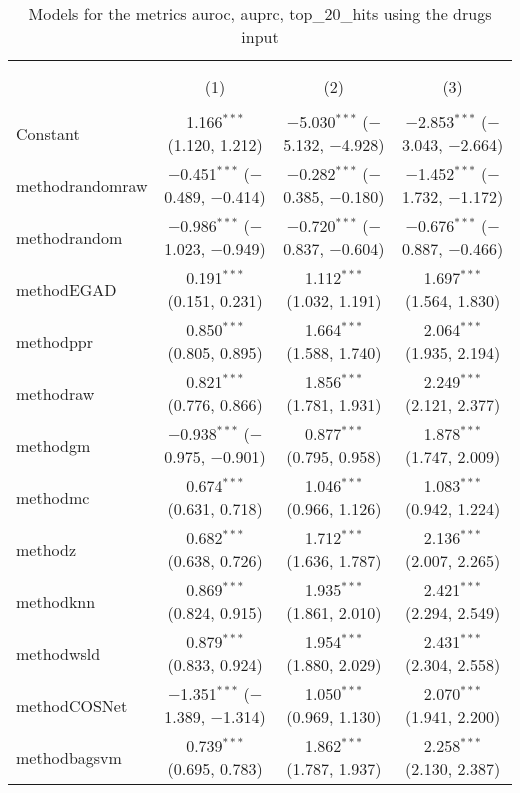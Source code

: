 
\begin{table}[!htbp] \centering 
  \caption{Models for the metrics auroc, auprc, top_20_hits using the drugs input} 
  \label{} 
\begin{tabular}{@{\extracolsep{5pt}}lccc} 
\\[-1.8ex]\hline 
\hline \\[-1.8ex] 
\\[-1.8ex] & (1) & (2) & (3)\\ 
\hline \\[-1.8ex] 
 Constant & 1.166$^{***}$ (1.120, 1.212) & $-$5.030$^{***}$ ($-$5.132, $-$4.928) & $-$2.853$^{***}$ ($-$3.043, $-$2.664) \\ 
  methodrandomraw & $-$0.451$^{***}$ ($-$0.489, $-$0.414) & $-$0.282$^{***}$ ($-$0.385, $-$0.180) & $-$1.452$^{***}$ ($-$1.732, $-$1.172) \\ 
  methodrandom & $-$0.986$^{***}$ ($-$1.023, $-$0.949) & $-$0.720$^{***}$ ($-$0.837, $-$0.604) & $-$0.676$^{***}$ ($-$0.887, $-$0.466) \\ 
  methodEGAD & 0.191$^{***}$ (0.151, 0.231) & 1.112$^{***}$ (1.032, 1.191) & 1.697$^{***}$ (1.564, 1.830) \\ 
  methodppr & 0.850$^{***}$ (0.805, 0.895) & 1.664$^{***}$ (1.588, 1.740) & 2.064$^{***}$ (1.935, 2.194) \\ 
  methodraw & 0.821$^{***}$ (0.776, 0.866) & 1.856$^{***}$ (1.781, 1.931) & 2.249$^{***}$ (2.121, 2.377) \\ 
  methodgm & $-$0.938$^{***}$ ($-$0.975, $-$0.901) & 0.877$^{***}$ (0.795, 0.958) & 1.878$^{***}$ (1.747, 2.009) \\ 
  methodmc & 0.674$^{***}$ (0.631, 0.718) & 1.046$^{***}$ (0.966, 1.126) & 1.083$^{***}$ (0.942, 1.224) \\ 
  methodz & 0.682$^{***}$ (0.638, 0.726) & 1.712$^{***}$ (1.636, 1.787) & 2.136$^{***}$ (2.007, 2.265) \\ 
  methodknn & 0.869$^{***}$ (0.824, 0.915) & 1.935$^{***}$ (1.861, 2.010) & 2.421$^{***}$ (2.294, 2.549) \\ 
  methodwsld & 0.879$^{***}$ (0.833, 0.924) & 1.954$^{***}$ (1.880, 2.029) & 2.431$^{***}$ (2.304, 2.558) \\ 
  methodCOSNet & $-$1.351$^{***}$ ($-$1.389, $-$1.314) & 1.050$^{***}$ (0.969, 1.130) & 2.070$^{***}$ (1.941, 2.200) \\ 
  methodbagsvm & 0.739$^{***}$ (0.695, 0.783) & 1.862$^{***}$ (1.787, 1.937) & 2.258$^{***}$ (2.130, 2.387) \\ 

\end{tabular}
\end{table}
